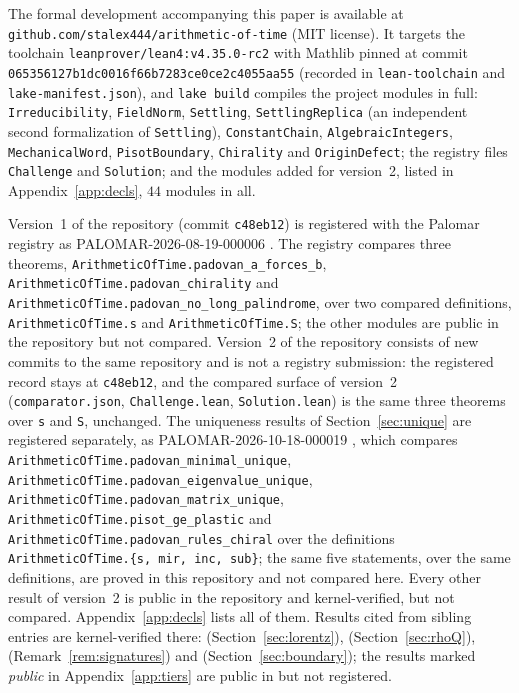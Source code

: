 \documentclass[11pt]{amsart}
\theoremstyle{plain}
\theoremstyle{definition}
\theoremstyle{remark}
\newcommand{\leanpinlong}{\texttt{leanprover/lean4:v4.35.0-rc2} with Mathlib pinned at
commit \texttt{065356127b1dc0016f66b7283ce0ce2c4055aa55}}
\begin{document}
The formal development accompanying this paper is available at
\texttt{github.com/stalex444/arithmetic-of-time} (MIT license). It targets the
toolchain \leanpinlong{} (recorded in \texttt{lean-toolchain} and
\texttt{lake-manifest.json}), and \texttt{lake build} compiles the project
modules in full: \texttt{Irreducibility}, \texttt{FieldNorm},
\texttt{Settling}, \texttt{SettlingReplica} (an independent second
formalization of \texttt{Settling}), \texttt{ConstantChain},
\texttt{AlgebraicIntegers}, \texttt{MechanicalWord},
\texttt{PisotBoundary}, \texttt{Chirality} and \texttt{OriginDefect}; the
registry files \texttt{Challenge} and \texttt{Solution}; and the modules added
for version~2, listed in Appendix~\ref{app:decls}, $44$ modules in all.

Version~1 of the repository (commit \texttt{c48eb12}) is registered with the
Palomar registry as PALOMAR-2026-08-19-000006 \cite{palomar-aot}. The registry
compares three theorems, \texttt{ArithmeticOfTime.padovan\_a\_forces\_b},
\texttt{ArithmeticOfTime.padovan\_chirality} and
\texttt{ArithmeticOfTime.padovan\_no\_long\_palindrome}, over two compared
definitions, \texttt{ArithmeticOfTime.s} and \texttt{ArithmeticOfTime.S}; the
other modules are public in the repository but not compared. Version~2 of the
repository consists of new commits to the same repository and is not a registry
submission: the registered record stays at \texttt{c48eb12}, and the compared
surface of version~2 (\texttt{comparator.json}, \texttt{Challenge.lean},
\texttt{Solution.lean}) is the same three theorems over \texttt{s} and
\texttt{S}, unchanged. The uniqueness results of Section~\ref{sec:unique} are
registered separately, as PALOMAR-2026-10-18-000019 \cite{palomar-slowclock},
which compares \texttt{ArithmeticOfTime.padovan\_minimal\_unique},
\texttt{ArithmeticOfTime.padovan\_eigenvalue\_unique},
\texttt{ArithmeticOfTime.padovan\_matrix\_unique},
\texttt{ArithmeticOfTime.pisot\_ge\_plastic} and
\texttt{ArithmeticOfTime.padovan\_rules\_chiral} over the definitions
\texttt{ArithmeticOfTime.\{s, mir, inc, sub\}}; the same five statements, over the
same definitions, are proved in this repository and not compared here. Every
other result of version~2 is public in the repository and kernel-verified, but
not compared. Appendix~\ref{app:decls} lists all of them. Results cited from sibling entries are
kernel-verified there: \cite{palomar-cph} (Section~\ref{sec:lorentz}),
\cite{palomar-compositum} (Section~\ref{sec:rhoQ}), \cite{palomar-trace}
(Remark~\ref{rem:signatures}) and \cite{palomar-mahler}
(Section~\ref{sec:boundary}); the results marked \emph{public} in
Appendix~\ref{app:tiers} are public in \cite{pdtlean} but not registered.
\end{document}
